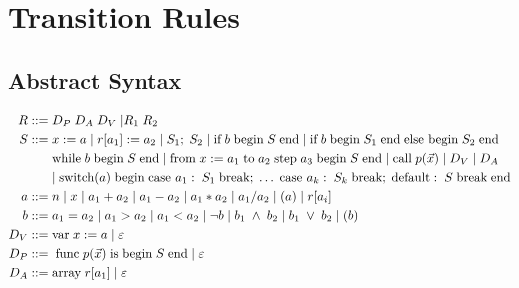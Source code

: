 


\chapter{Transition Rules}
\label{app:TransitionRules}

\section{Abstract Syntax}
\begin{align*}
R ::= \; & D_P \; D_A \; D_V \; | R_1 \; R_2 \; \\
S::= \; & x := a \; | \; r[a_1] := a_2 \; | \; S_1; \; S_2 \; | \; \text{if} \; b \; \text{begin} \; S \; \text{end} \; | \; \text{if} \; b \; \text{begin} \; S_1 \; \text{end} \; \text{else begin} \; S_2 \; \text{end} \\
~ & \text{while} \; b \; \text{begin} \; S \; \text{end} \; | \; \text{from} \; x := a_1 \; \text{to} \; a_2 \; \text{step} \; a_3 \; \text{begin} \; S \; \text{end} \; | \; \text{call} \; p(\vec{x}) \; | \; D_V \; | \; D_A \; \\
~ & | \; \text{switch}(a) \; \text{begin} \; \text{case } a_1: \; S_1 \; \text{break}; \; \dots \; \text{case } a_k: \; S_k \; \text{break}; \; \text{default}: \; S \; \text{break} \; \text{end} \\
a::= \; & n \; | \; x \; | \; a_1 + a_2 \; | \; a_1 - a_2 \; | \; a_1 * a_2 \; | \; a_1 / a_2 \; | \; (a) \; | \; r[a_i]\\
b::= \; &a_1 = a_2 \; | \; a_1 > a_2 \; | \; a_1 < a_2 \; | \; \neg b \; | \; b_1 \; \wedge \; b_2 \; | \; b_1 \; \vee \; b_2 \; | \; (b)\\
D_V::= \; & \text{var} \; x := a \;|\; \varepsilon\\
D_P::= \; & \; \text{func} \; p(\vec{x}) \; \text{is} \; \text{begin} \; S \; \text{end}  \;|\; \varepsilon\\
D_A::= \; & \text{array} \; r[a_1]  \;|\; \varepsilon\\
\end{align*}

